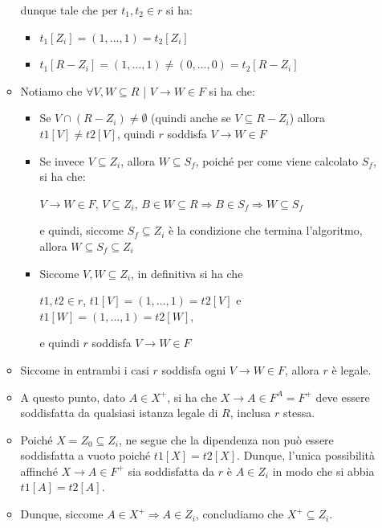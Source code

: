 \documentclass{article}
\begin{document}
\begin{itemize}
\begin{itemize}
  dunque tale che per $t_{1}, t_{2} \in r$ si ha:
  \begin{itemize}
    \item $t_{1}[Z_{i}] = (1, \dots, 1) = t_{2}[Z_{i}]$
    \item $t_{1}[R - Z_{i}] = (1, \dots, 1) \neq (0, \dots, 0) = t_{2}[R - Z_{i}]$
  \end{itemize}
    \item Notiamo che $\forall V, W \subseteq R$ | $V \rightarrow W \in F$ si ha che:
    \begin{itemize}
      \item Se $V \cap (R - Z_i) \neq \emptyset$ (quindi anche se $V \subseteq R - Z_i$) allora $t1[V] \neq t2[V]$, quindi $r$ soddisfa $V \rightarrow W \in F$
      \item Se invece $V \subseteq Z_i$, allora $W \subseteq S_f$, poiché per come viene calcolato $S_f$, si ha che:\par
      $V \rightarrow W \in F$, $V \subseteq Z_i$, $B \in W \subseteq R \Rightarrow B \in S_f \Rightarrow W \subseteq S_f$\par
      e quindi, siccome $S_f \subseteq Z_i$ è la condizione che termina l'algoritmo, allora $W \subseteq S_f \subseteq Z_i$
      \item Siccome $V, W \subseteq Z_i$, in definitiva si ha che\par $t1, t2 \in r$, $t1[V] = (1, \dots, 1) = t2[V]$ e $t1[W] = (1, \dots, 1) = t2[W]$,\par e quindi $r$ soddisfa $V \rightarrow W \in F$
    \end{itemize}
    \item Siccome in entrambi i casi $r$ soddisfa ogni $V \rightarrow W \in F$, allora $r$ è legale.
    \item A questo punto, dato $A \in X^+$, si ha che $X \rightarrow A \in F^A = F^+$ deve essere soddisfatta da qualsiasi istanza legale di $R$, inclusa $r$ stessa.
    \item Poiché $X = Z_0 \subseteq Z_i$, ne segue che la dipendenza non può essere soddisfatta a vuoto poiché $t1[X] = t2[X]$. Dunque, l'unica possibilità affinché $X \rightarrow A \in F^+$ sia soddisfatta da $r$ è $A \in Z_i$ in modo che si abbia $t1[A] = t2[A]$.
    \item Dunque, siccome $A \in X^+ \Rightarrow A \in Z_i$, concludiamo che $X^+ \subseteq Z_i$.
  
  \end{itemize}
\end{itemize}
\end{document}
